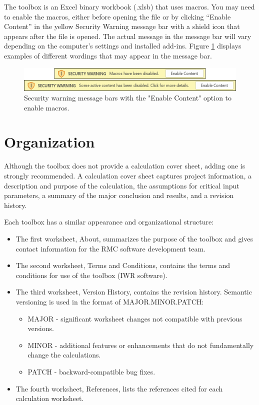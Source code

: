 \documentclass[
]{book}
\begin{document}
The toolbox is an Excel binary workbook (.xlsb) that uses macros. You may need to enable the macros, either before opening the file or by clicking ``Enable Content'' in the yellow Security Warning message bar with a shield icon that appears after the file is opened. The actual message in the message bar will vary depending on the computer's settings and installed add-ins. Figure \ref{fig:figure-1} displays examples of different wordings that may appear in the message bar.

\begin{figure}

{\centering \includegraphics{images/figure1} 

}

\caption{Security warning message bars with the "Enable Content" option to enable macros.}\label{fig:figure-1}
\end{figure}

\section{Organization}\label{organization}

Although the toolbox does not provide a calculation cover sheet, adding one is strongly recommended. A calculation cover sheet captures project information, a description and purpose of the calculation, the assumptions for critical input parameters, a summary of the major conclusion and results, and a revision history.

Each toolbox has a similar appearance and organizational structure:

\begin{itemize}
\item
  The first worksheet, About, summarizes the purpose of the toolbox and gives contact information for the RMC software development team.
\item
  The second worksheet, Terms and Conditions, contains the terms and conditions for use of the toolbox (IWR software).
\item
  The third worksheet, Version History, contains the revision history. Semantic versioning is used in the format of MAJOR.MINOR.PATCH:

  \begin{itemize}
  \item
    MAJOR - significant worksheet changes not compatible with previous versions.
  \item
    MINOR - additional features or enhancements that do not fundamentally change the calculations.
  \item
    PATCH - backward-compatible bug fixes.
  \end{itemize}
\item
  The fourth worksheet, References, lists the references cited for each calculation worksheet.
\end{itemize}
\end{document}
